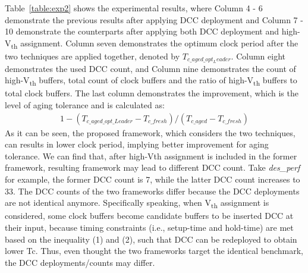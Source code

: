 Table~\ref{table:exp2} shows the experimental results, where Column 4 - 6 demonstrate the previous results after applying DCC deployment  and Column 7 - 10 demonstrate the counterparts after applying both DCC deployment and high-V\textsubscript{th} assignment. Column seven demonstrates the optimum clock period after the two techniques are applied together, denoted by $T_{c\_aged\_opt_Leader}$. Column eight demonstrates the used DCC count, and Column nine demonstrates the count of high-V\textsubscript{th} buffers, total count of clock buffers and the ratio of high-V\textsubscript{th} buffers to total clock buffers. The last column demonstrates the improvement, which is the level of aging tolerance and is calculated as:
\begin{gather*}
1 - (T_{c\_aged\_opt\_Leader} - T_{c\_fresh}) / (T_{c\_aged} - T_{c\_fresh})
\end{gather*}
As it can be seen, the proposed framework, which considers the two techniques, can results in lower clock period, implying better improvement for aging tolerance. We can find that, after high-Vth assignment is included in the former framework, resulting framework may lead to different DCC count. Take \textit{des\_perf} for example, the former DCC count is 7, while the latter DCC count increases to 33. The DCC counts of the two frameworks differ because the DCC deployments are not identical anymore. Specifically speaking, when V\textsubscript{th} assignment is considered, some clock buffers become candidate buffers to be inserted DCC at their input, because timing constraints (i.e., setup-time and hold-time) are met based on the inequality (1) and (2), such that DCC can be redeployed to obtain lower Tc. Thus, even thought the two frameworks target the identical benchmark, the DCC deployments/counts may differ.

